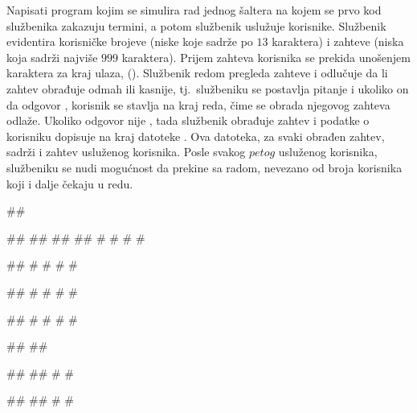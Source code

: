 \begin{Exercise}[label=606]
Napisati program kojim se simulira rad jednog šaltera na kojem se prvo kod službenika zakazuju 
termini, a potom službenik uslužuje korisnike. 
Službenik evidentira korisničke  brojeve (niske koje sadrže po $13$ karaktera) i zahteve (niska koja sadrži najviše $999$ karaktera). 
Prijem zahteva korisnika se prekida unošenjem karaktera za kraj ulaza, ().
Službenik redom pregleda zahteve i odlučuje da li zahtev obrađuje odmah ili kasnije, tj.~službeniku se postavlja pitanje 
 i ukoliko on da odgovor , 
korisnik se stavlja na kraj reda, čime se obrada njegovog zahteva odlaže. Ukoliko odgovor nije , tada službenik obrađuje zahtev i podatke o korisniku dopisuje na kraj datoteke . Ova datoteka, za svaki obrađen zahtev, sadrži  i zahtev usluženog korisnika.
Posle svakog $petog$ usluženog korisnika, službeniku se nudi mogućnost da prekine sa radom, nevezano od broja korisnika koji i dalje čekaju u redu. 

\begin{maxitest}
\begin{upotreba}{1}
##

#\naslovInt#
## 
##
##
# #
# #

##
# #
# #

##
# #
# #

##
# #
# #

##
##

##
##
# #

##
##
# #


\end{upotreba}
\end{maxitest}
\end{Exercise}

